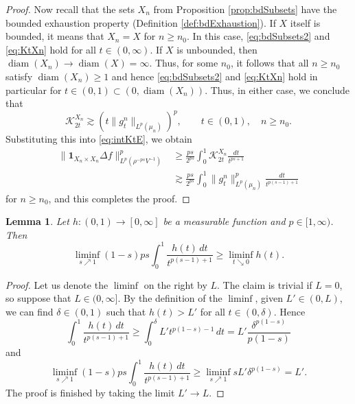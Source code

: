 \documentclass[11pt]{amsart}
\newtheorem{lemma}[theorem]{Lemma}
\theoremstyle{definition}
\theoremstyle{remark}
\numberwithin{equation}{section}
\newcommand{\Norm}[2]{\|#1\|_{#2}}
\begin{document}
\begin{proof}
Now recall that the sets $X_n$ from Proposition \ref{prop:bdSubsets} have the bounded
exhaustion property (Definition \ref{def:bdExhaustion}). If $X$ itself is bounded, it means
that $X_n=X$ for $n\geq n_0$.
In this case, \eqref{eq:bdSubsets2} and \eqref{eq:KtXn} hold for all $t\in(0,\infty)$. If
$X$ is unbounded, then $\operatorname{diam}(X_n)\to\operatorname{diam}(X)=\infty$. Thus, for
some $n_0$, it follows that all $n\geq n_0$ satisfy $\operatorname{diam}(X_n)\geq 1$ and
hence \eqref{eq:bdSubsets2} and \eqref{eq:KtXn} hold in particular for
$t\in(0,1)\subset(0,\operatorname{diam}(X_n))$. Thus, in either case, we conclude that
\begin{equation*}
  \mathcal K_{2t}^{X_n}
  \gtrsim (t\Norm{g_t^n}{L^p(\mu_n)})^p,\qquad t\in(0,1),\quad n\geq n_0.
\end{equation*}
Substituting this into \eqref{eq:intKtE}, we obtain
\begin{equation*}
\begin{split}
  \Norm{\mathbf{1}_{X_n\times X_n}\Delta f}{L^p(\rho^{-ps}V^{-1})}^p
  &\geq\frac{ps}{2^{ps}}\int_0^1\mathcal K_{2t}^{X_n}\frac{dt}{t^{ps+1}} \\
  &\gtrsim\frac{ps}{2^{ps}}\int_0^1\Norm{g_t^n}{L^p(\mu_n)}^p \frac{dt}{t^{p(s-1)+1}}
\end{split}
\end{equation*}
for $n\geq n_0$, and this completes the proof.
\end{proof}

\begin{lemma}\label{lem:2liminf}
Let $h:(0,1)\to[0,\infty]$ be a measurable function and $p\in[1,\infty)$. Then
\begin{equation*}
  \liminf_{s\nearrow 1}(1-s)ps\int_0^1\frac{h(t)\,dt}{t^{p(s-1)+1}}
  \geq \liminf_{t\searrow 0}h(t).
\end{equation*}
\end{lemma}

\begin{proof}
Let us denote the $\liminf$ on the right by $L$. The claim is trivial if $L=0$, so suppose
that $L\in(0,\infty]$.
By the definition of the $\liminf$, given $L'\in(0,L)$, we can find $\delta\in(0,1)$ such that
$h(t)>L'$ for all $t\in(0,\delta)$. Hence
\begin{equation*}
  \int_0^1\frac{h(t)\, dt}{t^{p(s-1)+1}}
  \geq \int_0^\delta L' t^{p(1-s)-1}\,dt
  =L'\frac{\delta^{p(1-s)}}{p(1-s)}
\end{equation*}
and
\begin{equation*}
  \liminf_{s\nearrow 1}(1-s)ps\int_0^1\frac{h(t)\,dt}{t^{p(s-1)+1}}
  \geq \liminf_{s\nearrow 1} sL'\delta^{p(1-s)}=L'.
\end{equation*}
The proof is finished by taking the limit $L'\to L$.
\end{proof}
\end{document}
